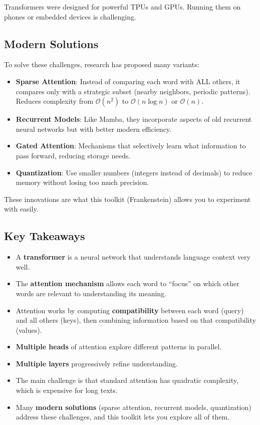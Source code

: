Transformers were designed for powerful TPUs and GPUs. Running them on phones or embedded devices is challenging.

\subsection{Modern Solutions}

To solve these challenges, research has proposed many variants:

\begin{itemize}[leftmargin=*]
    \item \textbf{Sparse Attention}: Instead of comparing each word with ALL others, it compares only with a strategic subset (nearby neighbors, periodic patterns). Reduces complexity from $\mathcal{O}(n^2)$ to $\mathcal{O}(n \log n)$ or $\mathcal{O}(n)$.
    \item \textbf{Recurrent Models}: Like Mamba, they incorporate aspects of old recurrent neural networks but with better modern efficiency.
    \item \textbf{Gated Attention}: Mechanisms that selectively learn what information to pass forward, reducing storage needs.
    \item \textbf{Quantization}: Use smaller numbers (integers instead of decimals) to reduce memory without losing too much precision.
\end{itemize}

These innovations are what this toolkit (Frankenstein) allows you to experiment with easily.

\subsection{Key Takeaways}

\begin{itemize}[leftmargin=*]
    \item A \textbf{transformer} is a neural network that understands language context very well.
    \item The \textbf{attention mechanism} allows each word to ``focus'' on which other words are relevant to understanding its meaning.
    \item Attention works by computing \textbf{compatibility} between each word (query) and all others (keys), then combining information based on that compatibility (values).
    \item \textbf{Multiple heads} of attention explore different patterns in parallel.
    \item \textbf{Multiple layers} progressively refine understanding.
    \item The main challenge is that standard attention has quadratic complexity, which is expensive for long texts.
    \item Many \textbf{modern solutions} (sparse attention, recurrent models, quantization) address these challenges, and this toolkit lets you explore all of them.
\end{itemize}

